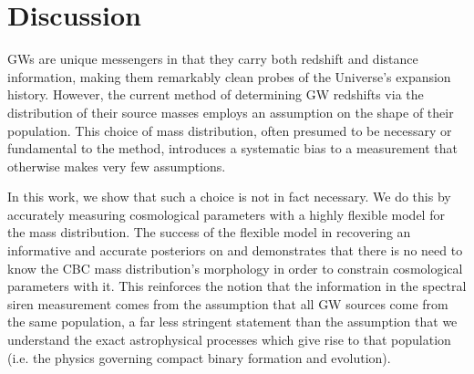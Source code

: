 \documentclass[]{aastex631}
\begin{document}

\section{Discussion}
\label{sec:discussion}

\acp{GW} are unique messengers in that they carry both redshift and distance information, making them remarkably clean probes of the Universe's expansion history. 
However, the current method of determining \ac{GW} redshifts via the distribution of their source masses employs an assumption on the shape of their population.
This choice of mass distribution, often presumed to be necessary or fundamental to the method, introduces a systematic bias to a measurement that otherwise makes very few assumptions.
    
In this work, we show that such a choice is not in fact necessary.
We do this by accurately measuring cosmological parameters with a highly flexible model for the mass distribution. 
The success of the flexible model in recovering an informative and accurate posteriors on \Ho{} and \Omm{} demonstrates that there is no need to know the \ac{CBC} mass distribution's morphology in order to constrain cosmological parameters with it.
This reinforces the notion that the information in the spectral siren measurement comes from the assumption that all \ac{GW} sources come from the same population, a far less stringent statement than the assumption that we understand the exact astrophysical processes which give rise to that population (i.e. the physics governing compact binary formation and evolution).
    
\end{document}
